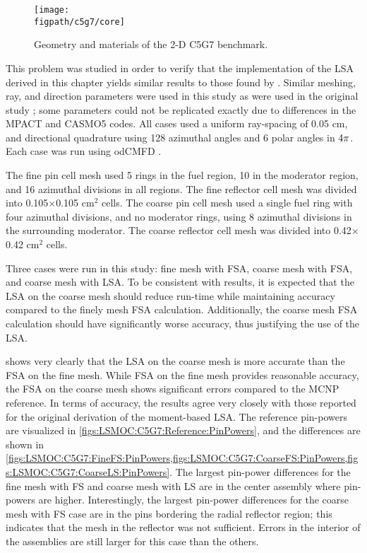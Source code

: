 {{{      \begin{figure}[htbp]
        \centering
        \texttt{[image: \\figpath/c5g7/core]}
        \caption{Geometry and materials of the 2-D C5G7 benchmark. \label{fig:LSMOC:C5G7:CoreGeom}}
      \end{figure}

      This problem was studied in order to verify that the implementation of the \ac{LSA} derived in this chapter yields similar results to those found by \citet{Ferrer2016}.
      Similar meshing, ray, and direction parameters were used in this study as were used in the original study \cite{Ferrer2016}; some parameters could not be replicated exactly due to differences in the MPACT and CASMO5 codes.
      All cases used a uniform ray-spacing of 0.05 cm, and directional quadrature using 128 azimuthal angles and 6 polar angles in $4\pi$.
      Each case was run using od\ac{CMFD} \cite{Zhu2016}.

      The fine pin cell mesh used 5 rings in the fuel region, 10 in the moderator region, and 16 azimuthal divisions in all regions.
      The fine reflector cell mesh was divided into 0.105$\times$0.105 cm$^2$ cells.
      The coarse pin cell mesh used a single fuel ring with four azimuthal divisions, and no moderator rings, using 8 azimuthal divisions in the surrounding moderator.
      The coarse reflector cell mesh was divided into 0.42$\times$0.42 cm$^2$ cells.

      Three cases were run in this study: fine mesh with \ac{FSA}, coarse mesh with \ac{FSA}, and coarse mesh with \ac{LSA}.
      To be consistent with \citet{Ferrer2016} results, it is expected that the \ac{LSA} on the coarse mesh should reduce run-time while maintaining accuracy compared to the finely mesh \ac{FSA} calculation.
      Additionally, the coarse mesh \ac{FSA} calculation should have significantly worse accuracy, thus justifying the use of the \ac{LSA}.

       shows very clearly that the \ac{LSA} on the coarse mesh is more accurate than the \ac{FSA} on the fine mesh.
      While \ac{FSA} on the fine mesh provides reasonable accuracy, the \ac{FSA} on the coarse mesh shows significant errors compared to the MCNP reference.
      In terms of accuracy, the results agree very closely with those reported for the original derivation of the moment-based \ac{LSA}.
      The reference pin-powers are visualized in \cref{figs:LSMOC:C5G7:Reference:PinPowers}, and the differences are shown in \cref{figs:LSMOC:C5G7:FineFS:PinPowers,figs:LSMOC:C5G7:CoarseFS:PinPowers,figs:LSMOC:C5G7:CoarseLS:PinPowers}.
      The largest pin-power differences for the fine mesh with \ac{FS} and coarse mesh with \ac{LS} are in the center assembly where pin-powers are higher.
      Interestingly, the largest pin-power differences for the coarse mesh with \ac{FS} case are in the pins bordering the radial reflector region;
        this indicates that the mesh in the reflector was not sufficient.
      Errors in the interior of the assemblies are still larger for this case than the others.

}}}
